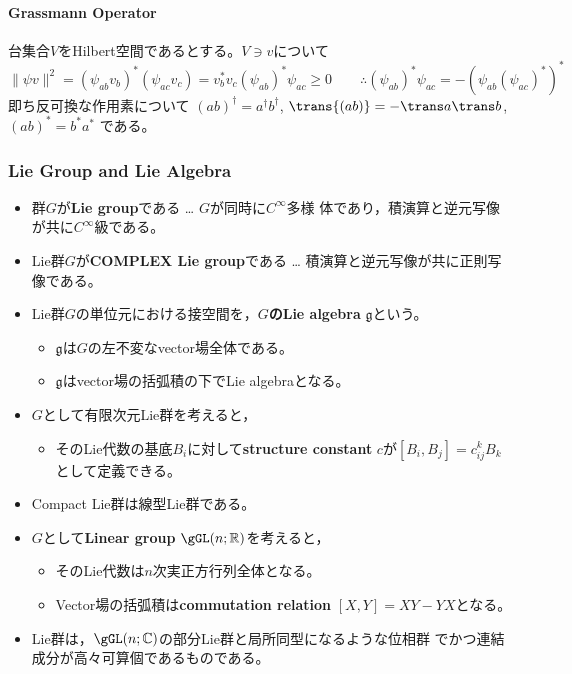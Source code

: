 \paragraph{Grassmann Operator}
台集合$V$をHilbert空間であるとする。$V\ni v$について
\begin{equation}
 \|\psi v\|^2=(\psi_{ab}v_b)^*(\psi_{ac}v_c) = v_b^*v_c(\psi_{ab})^*\psi_{ac}\ge 0
\qquad\therefore
(\psi_{ab})^*\psi_{ac}
 = -\left(\psi_{ab}(\psi_{ac})^*\right)^*
\end{equation}
即ち反可換な作用素について
$(ab)^\dagger = a^\dagger b^\dagger$,
$\trans{(ab)} = -\trans a \trans b$,
$(ab)^* = b^*a^*$ である。



\subsubsection{Lie Group and Lie Algebra}
\begin{itemize}
 \item 群$G$が{\bf Lie group}である … $G$が同時に$C^\infty$多様
       体であり，積演算と逆元写像が共に$C^\infty$級である。
 \item Lie群$G$が{\bf COMPLEX Lie group}である … 積演算と逆元写像が共に正則写像である。
\end{itemize}
\begin{itemize}
 \item Lie群$G$の単位元における接空間を，{\bf $G$のLie algebra}
       $\mathfrak g$という。
\begin{itemize}
 \item $\mathfrak g$は$G$の左不変なvector場全体である。
 \item $\mathfrak g$はvector場の括弧積の下でLie algebraとなる。
\end{itemize}
 \item $G$として有限次元Lie群を考えると，
\begin{itemize}
 \item そのLie代数の基底$B_i$に対して{\bf structure
       constant} $c$が$[B_i,B_j]=c^{k}_{ij}B_k$として定義できる。
\end{itemize}
\end{itemize}
\starline
\begin{itemize}
 \item Compact Lie群は線型Lie群である。
 \item $G$として{\bf Linear group} $\gGL(n;\Real)$を考えると，
 \begin{itemize}
  \item そのLie代数は$n$次実正方行列全体となる。
  \item Vector場の括弧積は{\bf commutation relation} $[X,Y]=XY-YX$となる。
 \end{itemize}
 \item Lie群は，$\gGL(n;\Complex)$の部分Lie群と局所同型になるような位相群
       でかつ連結成分が高々可算個であるものである。
\end{itemize}

